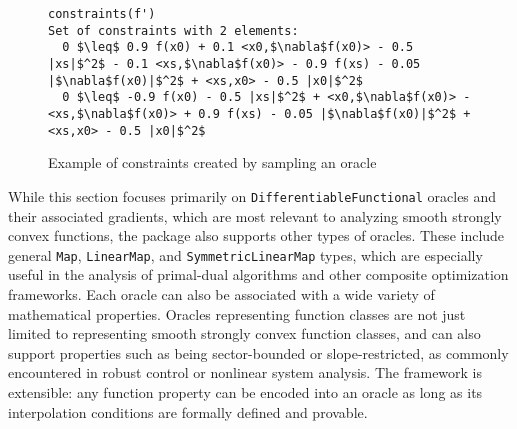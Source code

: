 \begin{figure}[!h]
	\begin{lstlisting}[mathescape]
constraints(f')
Set of constraints with 2 elements:
  0 $\leq$ 0.9 f(x0) + 0.1 <x0,$\nabla$f(x0)> - 0.5 |xs|$^2$ - 0.1 <xs,$\nabla$f(x0)> - 0.9 f(xs) - 0.05 |$\nabla$f(x0)|$^2$ + <xs,x0> - 0.5 |x0|$^2$
  0 $\leq$ -0.9 f(x0) - 0.5 |xs|$^2$ + <x0,$\nabla$f(x0)> - <xs,$\nabla$f(x0)> + 0.9 f(xs) - 0.05 |$\nabla$f(x0)|$^2$ + <xs,x0> - 0.5 |x0|$^2$
	\end{lstlisting}
	\caption{Example of constraints created by sampling an oracle}
	\label{ex_orc_constraints}
\end{figure}

While this section focuses primarily on \texttt{DifferentiableFunctional} oracles and their associated gradients, which are most relevant to analyzing smooth strongly convex functions, the package also supports other types of oracles. These include general \texttt{Map}, \texttt{LinearMap}, and \texttt{SymmetricLinearMap} types, which are especially useful in the analysis of primal-dual algorithms and other composite optimization frameworks. Each oracle can also be associated with a wide variety of mathematical properties. Oracles representing function classes are not just limited to representing smooth strongly convex function classes, and can also support properties such as being sector-bounded or slope-restricted, as commonly encountered in robust control or nonlinear system analysis. The framework is extensible: any function property can be encoded into an oracle as long as its interpolation conditions are formally defined and provable.


